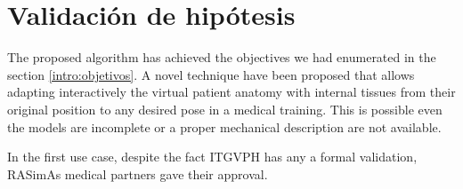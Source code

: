 \section{Validación de hipótesis}
\label{conclu:hipotesis}

The proposed algorithm has achieved the objectives we had enumerated in the section \ref{intro:objetivos}. A novel technique have been proposed that allows adapting interactively the virtual patient anatomy with internal tissues from their original position to any desired pose in a medical training. This is possible even the models are incomplete or a proper mechanical description are not available.

In the first use case, despite the fact \ac{ITGVPH} has any a formal validation, \ac{RASimAs} medical partners gave their approval. 







